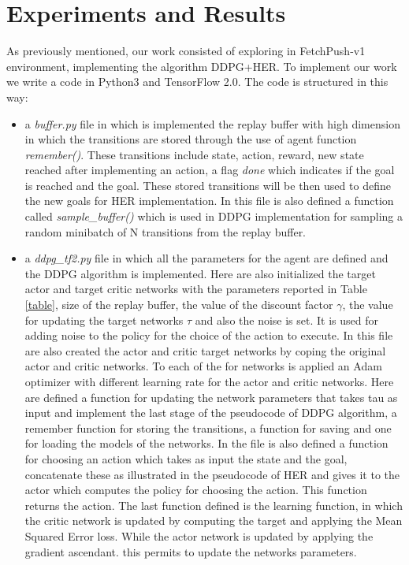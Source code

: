 \documentclass[a4paper]{report}
\begin{document}
\chapter{Experiments and Results \label{exp}}

As previously  mentioned, our work consisted of exploring in FetchPush-v1 environment, implementing the algorithm DDPG+HER. To implement our work we write a code in Python3 and TensorFlow 2.0. The code is structured in this way:

\begin{itemize}
\item a \textit{buffer.py} file in which is implemented the replay buffer with high dimension in which the transitions are stored through the use of agent function \textit{remember()}. These transitions include state, action, reward, new state reached after implementing an action, a flag \textit{done} which indicates if the goal is reached and the goal. These stored transitions will be then used to define the new goals for HER implementation. In this file is also defined a function called \textit{sample\_buffer()} which is used in DDPG implementation for sampling a random minibatch of N transitions from the replay buffer.

\item a \textit{ddpg\_tf2.py} file in which all the parameters for the agent are defined and the DDPG algorithm is implemented. Here are also initialized the target actor and target critic networks with the parameters reported in Table \ref{table}, size of the replay buffer, the value of the discount factor $\gamma$, the value for updating the target networks $\tau$ and also the noise is set. It is used for adding noise to the policy for the choice of the action to execute. In this file are also created the actor and critic target networks by coping the original actor and critic networks. To each of the for networks is applied an Adam optimizer with different learning rate for the actor and critic networks. Here are defined a function for updating the network parameters that takes tau as input and implement the last stage of the pseudocode of DDPG algorithm, a remember function for storing the transitions, a function for saving and one for loading the models of the networks. In the file is also defined a function for choosing an action which takes as input the state and the goal, concatenate these as illustrated in the pseudocode of HER and gives it to the actor which computes the policy for choosing the action. This function returns the action. The last function defined is the learning function, in which the critic network is updated by computing the target and applying the Mean Squared Error loss. While the actor network is updated by applying the gradient ascendant. this permits to update the networks parameters.



\end{itemize}
\end{document}
